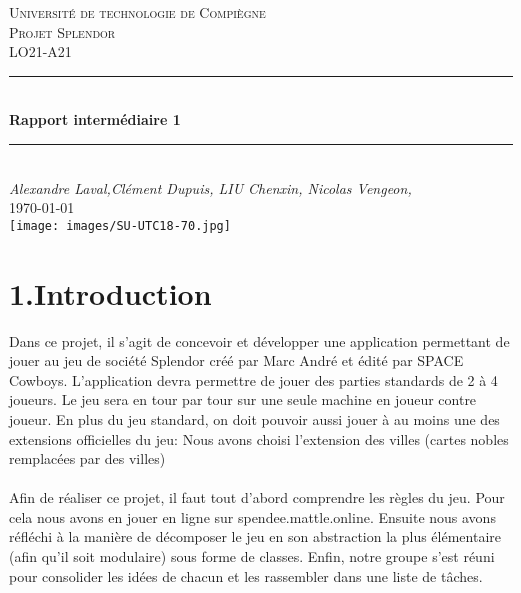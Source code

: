 \documentclass[a4paper]{article}
\begin{document}
\begin{titlepage}

\newcommand{\HRule}{\rule{\linewidth}{0.5mm}} 							%
\center 
 
\textsc{\LARGE Université de technologie de Compiègne}\\[1cm]

\textsc{\Large Projet Splendor}\\[0.2cm]
\textsc{\large LO21-A21}\\[1cm] 										%
\HRule \\[0.8cm]
{ \huge \bfseries Rapport intermédiaire 1}\\[0.7cm]								%
\HRule \\[2cm]
\large
\emph{Alexandre Laval,Clément Dupuis, LIU Chenxin, Nicolas Vengeon,  }\\
{\large \today}\\[13cm]
\texttt{[image: images/SU-UTC18-70.jpg]}\\[1cm] 	%
\vfill 
\end{titlepage}


\section*{1.Introduction}

Dans ce projet, il s’agit de concevoir et développer une application permettant de jouer au jeu de 
société Splendor créé par Marc André et édité par SPACE Cowboys. 
L’application devra permettre de jouer des parties standards de 2 à 4 joueurs. Le jeu sera en tour par tour sur une seule machine en joueur contre joueur. En plus du jeu standard, on doit pouvoir aussi jouer
à au moins une des extensions officielles du jeu: Nous avons choisi l'extension des villes (cartes nobles remplacées par des villes)\\
\\
Afin de réaliser ce projet, il faut tout d'abord comprendre les règles du jeu. 
Pour cela nous avons en jouer en ligne sur spendee.mattle.online.
Ensuite nous avons réfléchi à la manière de décomposer le jeu en son abstraction la plus élémentaire 
(afin qu'il soit modulaire) sous forme de classes. 
Enfin, notre groupe s'est réuni pour consolider les idées de chacun et les rassembler dans une liste de tâches.
\end{document}
